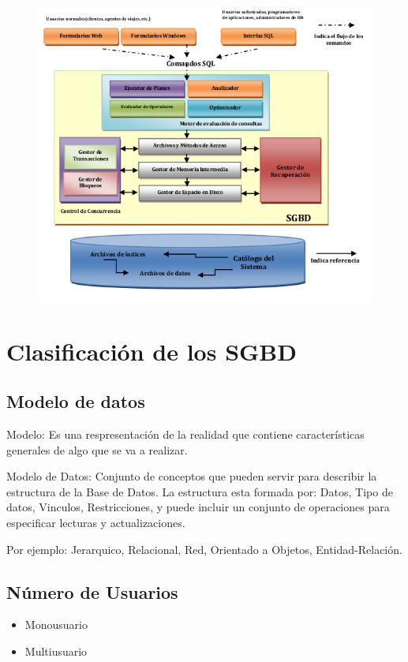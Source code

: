\documentclass[12pt, fleqn]{report}                             %
\theoremstyle{break}                                            %
\begin{document}
			\begin{figure}[H]
			    \centering
			    \includegraphics[scale=.7]{SGBD.png}
			\end{figure}
		
\section{Clasificación de los SGBD}
	\subsection{Modelo de datos}
	Modelo: Es una respresentación de la realidad que contiene características generales de algo que se va a realizar.

	Modelo de Datos: Conjunto de conceptos que pueden servir para describir la estructura de la Base de Datos. La estructura esta formada por: Datos, Tipo de datos, Vinculos, Restricciones, y puede incluir un conjunto de operaciones para especificar lecturas y actualizaciones.

	Por ejemplo: Jerarquico, Relacional, Red, Orientado a Objetos, Entidad-Relación.
	\subsection{Número de Usuarios}
	\begin{itemize}
		\item Monousuario
		\item Multiusuario
	\end{itemize}
\end{document}
